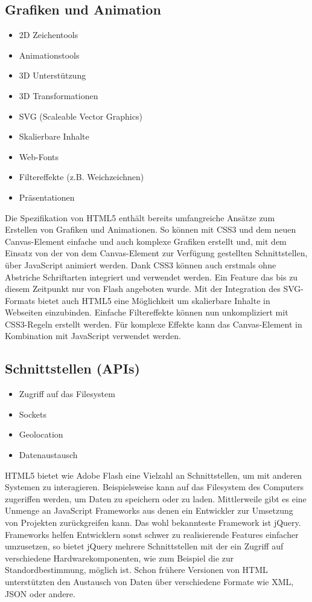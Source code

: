 \subsection{Grafiken und Animation}
\begin{itemize}
  \item{2D Zeichentools}
  \item{Animationstools}
  \item{3D Unterstützung}
  \item{3D Transformationen}
  \item{SVG (Scaleable Vector Graphics)}
  \item{Skalierbare Inhalte}
  \item{Web-Fonts}
  \item{Filtereffekte (z.B. Weichzeichnen)}
  \item{Präsentationen}
\end{itemize}
Die Spezifikation von HTML5 enthält bereits umfangreiche Ansätze zum Erstellen
von Grafiken und Animationen. So können mit CSS3 und dem neuen Canvas-Element
einfache und auch komplexe Grafiken erstellt und, mit dem Einsatz von der von
dem Canvas-Element zur Verfügung gestellten Schnittstellen, über JavaScript
animiert werden. Dank CSS3 können auch erstmals ohne Abstriche Schriftarten
integriert und verwendet werden. Ein Feature das bis zu diesem Zeitpunkt nur
von Flash angeboten wurde. Mit der Integration des SVG-Formats bietet auch
HTML5 eine Möglichkeit um skalierbare Inhalte in Webseiten einzubinden.
Einfache Filtereffekte können nun unkompliziert mit CSS3-Regeln erstellt
werden. Für komplexe Effekte kann das Canvas-Element in Kombination mit
JavaScript verwendet werden.

\subsection{Schnittstellen (APIs)}
\begin{itemize}
  \item{Zugriff auf das Filesystem}
  \item{Sockets}
  \item{Geolocation}
  \item{Datenaustausch}
\end{itemize}
HTML5 bietet wie Adobe Flash eine Vielzahl an Schnittstellen, um mit anderen
Systemen zu interagieren. Beispielsweise kann auf das Filesystem des
Computers zugeriffen werden, um Daten zu speichern oder zu laden.
Mittlerweile gibt es eine Unmenge an JavaScript Frameworks aus denen ein
Entwickler zur Umsetzung von Projekten zurückgreifen kann. Das wohl
bekannteste Framework ist jQuery. Frameworks helfen Entwicklern sonst schwer
zu realisierende Features einfacher umzusetzen, so bietet jQuery mehrere
Schnittstellen mit der ein Zugriff auf verschiedene Hardwarekomponenten, wie
zum Beispiel die zur Standordbestimmung, möglich ist. Schon frühere Versionen
von HTML unterstützten den Austausch von Daten über verschiedene Formate
wie XML, JSON oder andere.

